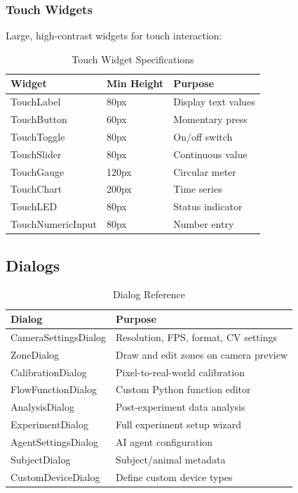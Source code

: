 \documentclass[11pt,a4paper]{article}
\begin{document}
\subsubsection{Touch Widgets}

Large, high-contrast widgets for touch interaction:

\begin{table}[H]
\centering
\begin{tabular}{@{}lll@{}}
\toprule
\textbf{Widget} & \textbf{Min Height} & \textbf{Purpose} \\
\midrule
TouchLabel & 80px & Display text values \\
TouchButton & 60px & Momentary press \\
TouchToggle & 80px & On/off switch \\
TouchSlider & 80px & Continuous value \\
TouchGauge & 120px & Circular meter \\
TouchChart & 200px & Time series \\
TouchLED & 80px & Status indicator \\
TouchNumericInput & 80px & Number entry \\
\bottomrule
\end{tabular}
\caption{Touch Widget Specifications}
\end{table}

\subsection{Dialogs}

\begin{table}[H]
\centering
\begin{tabular}{@{}lp{8cm}@{}}
\toprule
\textbf{Dialog} & \textbf{Purpose} \\
\midrule
CameraSettingsDialog & Resolution, FPS, format, CV settings \\
ZoneDialog & Draw and edit zones on camera preview \\
CalibrationDialog & Pixel-to-real-world calibration \\
FlowFunctionDialog & Custom Python function editor \\
AnalysisDialog & Post-experiment data analysis \\
ExperimentDialog & Full experiment setup wizard \\
AgentSettingsDialog & AI agent configuration \\
SubjectDialog & Subject/animal metadata \\
CustomDeviceDialog & Define custom device types \\
\bottomrule
\end{tabular}
\caption{Dialog Reference}
\end{table}
\end{document}
